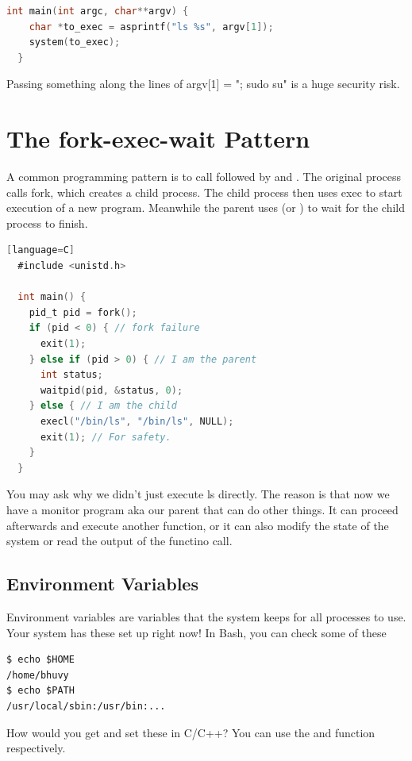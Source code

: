 \begin{lstlisting}[language=C]
  int main(int argc, char**argv) {
    char *to_exec = asprintf("ls %s", argv[1]);
    system(to_exec);
  }
\end{lstlisting}

Passing something along the lines of argv[1] = "; sudo su" is a huge security risk.

\section{The fork-exec-wait Pattern}

A common programming pattern is to call  followed by  and .
The original process calls fork, which creates a child process.
The child process then uses exec to start execution of a new program.
Meanwhile the parent uses  (or ) to wait for the child process to finish.

\begin{lstlisting}[language=C][language=C]
  #include <unistd.h>

  int main() {
    pid_t pid = fork();
    if (pid < 0) { // fork failure
      exit(1);
    } else if (pid > 0) { // I am the parent
      int status;
      waitpid(pid, &status, 0);
    } else { // I am the child
      execl("/bin/ls", "/bin/ls", NULL);
      exit(1); // For safety.
    }
  }
\end{lstlisting}

You may ask why we didn't just execute ls directly.
The reason is that now we have a monitor program aka our parent that can do other things.
It can proceed afterwards and execute another function, or it can also modify the state of the system or read the output of the functino call.

\subsection{Environment Variables}

Environment variables are variables that the system keeps for all processes to use.
Your system has these set up right now!
In Bash, you can check some of these

\begin{verbatim}
$ echo $HOME
/home/bhuvy
$ echo $PATH
/usr/local/sbin:/usr/bin:...
\end{verbatim}

How would you get and set these in C/C++? You can use the  and  function respectively.

